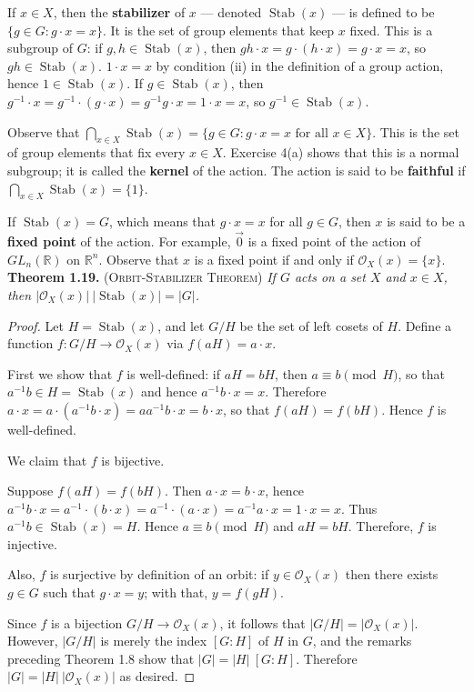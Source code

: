 \documentclass[leqno]{book}
\begin{document}
If $x\in X$, then the \textbf{stabilizer} of $x$ \---- denoted $\operatorname{Stab}(x)$ \---- is defined to be $\{g\in G:g\cdot x=x\}$.  It is the set of group elements that keep $x$ fixed.  This is a subgroup of $G$: if $g,h\in\operatorname{Stab}(x)$, then $gh\cdot x=g\cdot(h\cdot x)=g\cdot x=x$, so $gh\in\operatorname{Stab}(x)$.  $1\cdot x=x$ by condition (ii) in the definition of a group action, hence $1\in\operatorname{Stab}(x)$.  If $g\in\operatorname{Stab}(x)$, then $g^{-1}\cdot x=g^{-1}\cdot(g\cdot x)=g^{-1}g\cdot x=1\cdot x=x$, so $g^{-1}\in\operatorname{Stab}(x)$.

Observe that $\bigcap_{x\in X}\operatorname{Stab}(x)=\{g\in G:g\cdot x=x\text{ for all }x\in X\}$.  This is the set of group elements that fix every $x\in X$.  Exercise 4(a) shows that this is a normal subgroup; it is called the \textbf{kernel} of the action.  The action is said to be \textbf{faithful} if $\bigcap_{x\in X}\operatorname{Stab}(x)=\{1\}$.

If $\operatorname{Stab}(x)=G$, which means that $g\cdot x=x$ for all $g\in G$, then $x$ is said to be a \textbf{fixed point} of the action.  For example, $\vec 0$ is a fixed point of the action of $GL_n(\mathbb R)$ on $\mathbb R^n$.  Observe that $x$ is a fixed point if and only if $\mathcal O_X(x)=\{x\}$.\\%

\noindent\textbf{Theorem 1.19.} (\textsc{Orbit-Stabilizer Theorem}) \emph{If $G$ acts on a set $X$ and $x\in X$, then $|\mathcal O_X(x)|~|\operatorname{Stab}(x)|=|G|$.}
\begin{proof}
Let $H=\operatorname{Stab}(x)$, and let $G/H$ be the set of left cosets of $H$.  Define a function $f:G/H\to\mathcal O_X(x)$ via $f(aH)=a\cdot x$.

First we show that $f$ is well-defined: if $aH=bH$, then $a\equiv b\pmod H$, so that $a^{-1}b\in H=\operatorname{Stab}(x)$ and hence $a^{-1}b\cdot x=x$.  Therefore $a\cdot x=a\cdot(a^{-1}b\cdot x)=aa^{-1}b\cdot x=b\cdot x$, so that $f(aH)=f(bH)$.  Hence $f$ is well-defined.

We claim that $f$ is bijective.

Suppose $f(aH)=f(bH)$.  Then $a\cdot x=b\cdot x$, hence $a^{-1}b\cdot x=a^{-1}\cdot(b\cdot x)=a^{-1}\cdot(a\cdot x)=a^{-1}a\cdot x=1\cdot x=x$.  Thus $a^{-1}b\in\operatorname{Stab}(x)=H$.  Hence $a\equiv b\pmod H$ and $aH=bH$.  Therefore, $f$ is injective.

Also, $f$ is surjective by definition of an orbit: if $y\in\mathcal O_X(x)$ then there exists $g\in G$ such that $g\cdot x=y$; with that, $y=f(gH)$.

Since $f$ is a bijection $G/H\to\mathcal O_X(x)$, it follows that $|G/H|=|\mathcal O_X(x)|$.  However, $|G/H|$ is merely the index $[G:H]$ of $H$ in $G$, and the remarks preceding Theorem 1.8 show that $|G|=|H|~[G:H]$.  Therefore $|G|=|H|~|\mathcal O_X(x)|$ as desired.
\end{proof}
\end{document}
